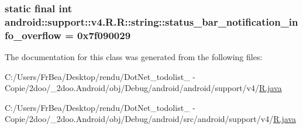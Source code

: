 \hypertarget{classandroid_1_1support_1_1v4_1_1_r_1_1string_3d73902bdc5d92717a79dd0c37e7c986}{
\subsubsection[{status\_\-bar\_\-notification\_\-info\_\-overflow}]{\setlength{\rightskip}{0pt plus 5cm}static final int android::support::v4.R.R::string::status\_\-bar\_\-notification\_\-info\_\-overflow = 0x7f090029}}
\label{classandroid_1_1support_1_1v4_1_1_r_1_1string_3d73902bdc5d92717a79dd0c37e7c986}




The documentation for this class was generated from the following files:\begin{CompactItemize}
\item 
C:/Users/FrBea/Desktop/rendu/DotNet\_\-todolist\_ - Copie/2doo/\_\-2doo.Android/obj/Debug/android/android/support/v4/\hyperlink{android_2support_2v4_2_r_8java}{R.java}\item 
C:/Users/FrBea/Desktop/rendu/DotNet\_\-todolist\_ - Copie/2doo/\_\-2doo.Android/obj/Debug/android/src/android/support/v4/\hyperlink{src_2android_2support_2v4_2_r_8java}{R.java}\end{CompactItemize}
